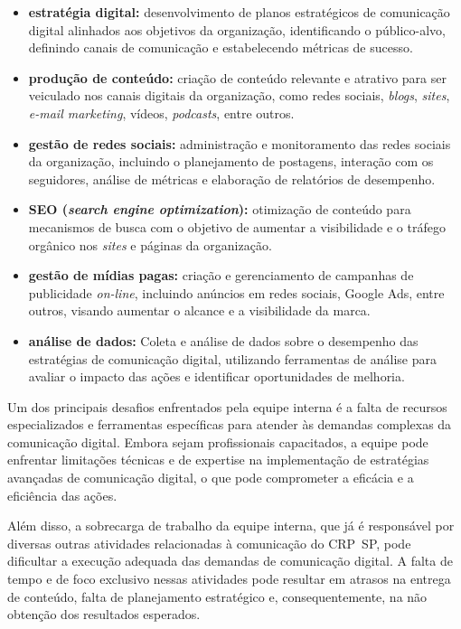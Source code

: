 \documentclass[oneside,a4paper,article]{memoir}
\begin{document}
\begin{itemize}
	\item
	      \textbf{estratégia digital:} desenvolvimento de planos estratégicos de
	      comunicação digital alinhados aos objetivos da organização,
	      identificando o público-alvo, definindo canais de comunicação e
	      estabelecendo métricas de sucesso.
	\item
	      \textbf{produção de conteúdo:} criação de conteúdo relevante e atrativo para
	      ser veiculado nos canais digitais da organização, como redes sociais,
	      \textit{blogs}, \textit{sites}, \textit{e-mail marketing}, vídeos, \textit{podcasts}, entre outros.
	\item
	      \textbf{gestão de redes sociais:} administração e monitoramento das redes
	      sociais da organização, incluindo o planejamento de postagens,
	      interação com os seguidores, análise de métricas e elaboração de
	      relatórios de desempenho.
	\item
	      \textbf{SEO (\textit{search engine optimization}):} otimização de conteúdo para
	      mecanismos de busca com o objetivo de aumentar a visibilidade e o
	      tráfego orgânico nos \textit{sites} e páginas da organização.
	\item
	      \textbf{gestão de mídias pagas:} criação e gerenciamento de campanhas de
	      publicidade  \textit{on-line}, incluindo anúncios em redes sociais, Google Ads,
	      entre outros, visando aumentar o alcance e a visibilidade da marca.
	\item
	      \textbf{análise de dados:} Coleta e análise de dados sobre o desempenho das
	      estratégias de comunicação digital, utilizando ferramentas de análise
	      para avaliar o impacto das ações e identificar oportunidades de
	      melhoria.
\end{itemize}

Um dos principais desafios enfrentados pela equipe interna é a falta de
recursos especializados e ferramentas específicas para atender às
demandas complexas da comunicação digital. Embora sejam profissionais
capacitados, a equipe pode enfrentar limitações técnicas e de expertise
na implementação de estratégias avançadas de comunicação digital, o que
pode comprometer a eficácia e a eficiência das ações.

Além disso, a sobrecarga de trabalho da equipe interna, que já é
responsável por diversas outras atividades relacionadas à comunicação do
CRP~SP, pode dificultar a execução adequada das demandas de comunicação
digital. A falta de tempo e de foco exclusivo nessas atividades pode
resultar em atrasos na entrega de conteúdo, falta de planejamento
estratégico e, consequentemente, na não obtenção dos resultados
esperados.
\end{document}
